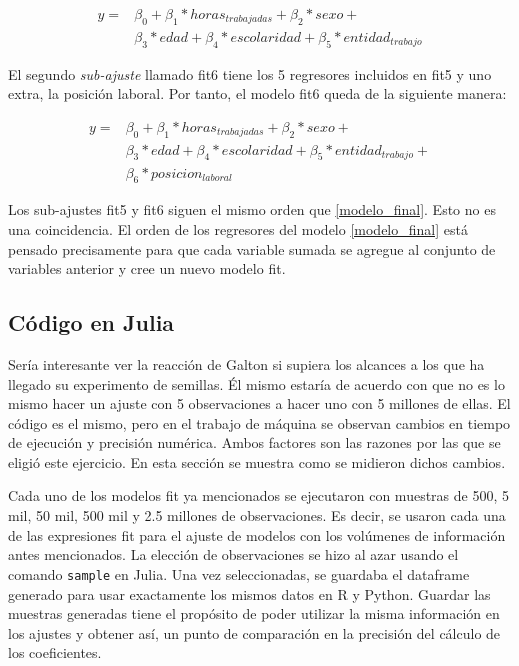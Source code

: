 \begin{equation*}
    \begin{aligned}
 	y =& \beta_0 + \beta_1*horas_{trabajadas} + \beta_2*sexo + \\
    	&\beta_3*edad + \beta_4*escolaridad + \beta_5*entidad_{trabajo} 
    \end{aligned}
\end{equation*}


El segundo \textit{sub-ajuste} llamado \textsf{fit6} tiene los 5 regresores incluidos en \textsf{fit5} y uno extra, la posición laboral. Por tanto, el modelo \textsf{fit6} queda de la siguiente manera: 

\begin{equation*}
    \begin{aligned}
    	y =& \beta_0 + \beta_1*horas_{trabajadas} + \beta_2*sexo + \\
    	&\beta_3*edad + \beta_4*escolaridad + \beta_5*entidad_{trabajo} + \\
    	& \beta_6*posicion_{laboral}
    \end{aligned}
\end{equation*}

Los sub-ajustes \textsf{fit5} y \textsf{fit6} siguen el mismo orden que \ref{modelo_final}. Esto no es una coincidencia. El orden de los regresores del modelo \ref{modelo_final} está pensado precisamente para que cada variable sumada se agregue al conjunto de variables anterior y cree un nuevo modelo \textsf{fit}.

\subsection{Código en Julia}

Sería interesante ver la reacción de Galton si supiera los alcances a los que ha llegado su experimento de semillas. Él mismo estaría de acuerdo con que no es lo mismo hacer un ajuste con 5 observaciones a hacer uno con 5 millones de ellas. El código es el mismo, pero en el trabajo de máquina se observan cambios en tiempo de ejecución y precisión numérica. Ambos factores son las razones por las que se eligió este ejercicio. En esta sección se muestra como se midieron dichos cambios.

Cada uno de los modelos \textsf{fit} ya mencionados se ejecutaron con muestras de 500, 5 mil, 50 mil, 500 mil y 2.5 millones de observaciones. Es decir, se usaron cada una de las expresiones \textsf{fit} para el ajuste de modelos con los volúmenes de información antes mencionados. La elección de observaciones se hizo al azar usando el comando \texttt{sample} en \textsf{Julia}. Una vez seleccionadas, se guardaba el dataframe generado para usar exactamente los mismos datos en \textsf{R} y \textsf{Python}. Guardar las muestras generadas tiene el propósito de poder utilizar la misma información en los ajustes y obtener así, un punto de comparación en la precisión del cálculo de los coeficientes. 

